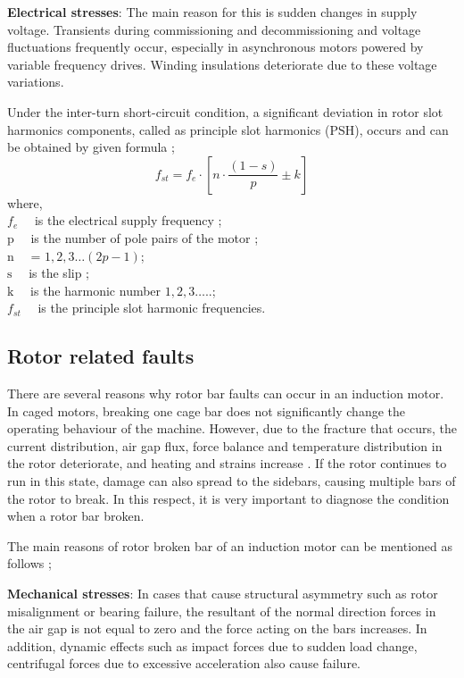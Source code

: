 \textbf{Electrical stresses}: The main reason for this is sudden changes in supply voltage. Transients during commissioning and decommissioning and voltage fluctuations frequently occur, especially in asynchronous motors powered by variable frequency drives. Winding insulations deteriorate due to these voltage variations.

Under the inter-turn short-circuit condition, a significant deviation in rotor slot harmonics components, called as principle slot harmonics (PSH), occurs and can be obtained by given formula \cite{Penman};
\begin{equation}
	f_{st}=f_{e} \cdot\left[n \cdot \frac{(1-s)}{p} \pm k\right]
	\label{statorfault}
\end{equation}
where,\\
$f_{e} \quad$ is the electrical supply frequency ;\\
$\mathrm{p} \quad$ is the number of pole pairs of the motor ;\\
$\mathrm{n} \quad$ = $1,2,3 \ldots (2p-1)$;\\
$\mathrm{s} \quad$ is the slip ;\\
$\mathrm{k} \quad$ is the harmonic number $1,2,3 \ldots$..;\\
$f_{st} \quad$ is the principle slot harmonic frequencies.

\subsection{Rotor related faults}

There are several reasons why rotor bar faults can occur in an induction motor. In caged motors, breaking one cage bar does not significantly change the operating behaviour of the machine. However, due to the fracture that occurs, the current distribution, air gap flux, force balance and temperature distribution in the rotor deteriorate, and heating and strains increase \cite{imeryuz2009asenkron}. If the rotor continues to run in this state, damage can also spread to the sidebars, causing multiple bars of the rotor to break. In this respect, it is very important to diagnose the condition when a rotor bar broken.

The main reasons of rotor broken bar of an induction motor can be mentioned as follows \cite{imeryuz2009asenkron,filippetti2013condition,bonnett1999root,Siddique};

\textbf{Mechanical stresses}: In cases that cause structural asymmetry such as rotor misalignment or bearing failure, the resultant of the normal direction forces in the air gap is not equal to zero and the force acting on the bars increases. In addition, dynamic effects such as impact forces due to sudden load change, centrifugal forces due to excessive acceleration also cause failure.

